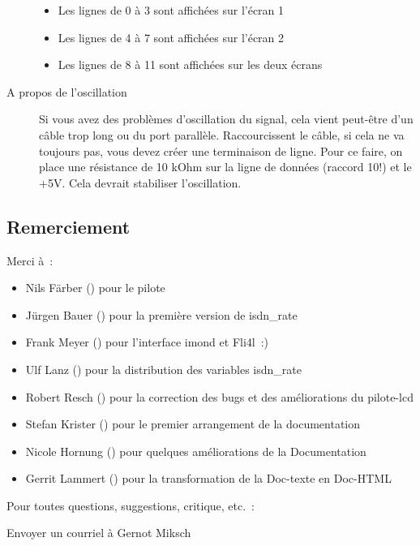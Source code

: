 \begin{description}
  \begin{itemize}
  \item Les lignes de 0 à 3 sont affichées sur l'écran 1

  \item Les lignes de 4 à 7 sont affichées sur l'écran 2

  \item Les lignes de 8 à 11 sont affichées sur les deux écrans
  \end{itemize}


 \item [A propos de l'oscillation]

  Si vous avez des problèmes d'oscillation du signal, cela vient peut-être
  d'un câble trop long ou du port parallèle. Raccourcissent le câble, si
  cela ne va toujours pas, vous devez créer une terminaison de ligne. Pour
  ce faire, on place une résistance de 10 kOhm sur la ligne de données
  (raccord 10!) et le +5V. Cela devrait stabiliser l'oscillation.

\end{description}


\subsection{Remerciement}

  Merci à~:

  \begin{itemize}
  \item Nils Färber () pour le pilote

  \item Jürgen Bauer () pour la première version de isdn\_rate

  \item Frank Meyer () pour l'interface imond et Fli4l~:)

  \item Ulf Lanz () pour la distribution des variables isdn\_rate

  \item Robert Resch () pour la correction des bugs et
    des améliorations du pilote-lcd

  \item Stefan Krister () pour le premier
    arrangement de la documentation

   \item Nicole Hornung () pour quelques améliorations
     de la Documentation 

   \item Gerrit Lammert () pour la transformation de la
     Doc-texte en Doc-HTML
  \end{itemize}


    Pour toutes questions, suggestions, critique, etc.~:

    Envoyer un courriel à Gernot Miksch 

